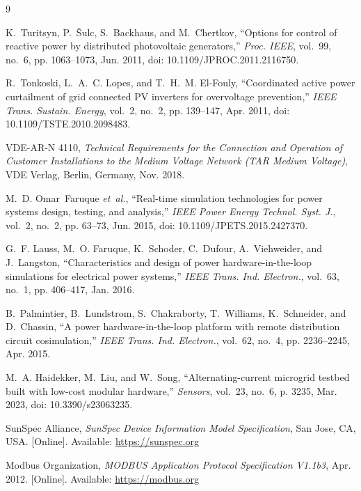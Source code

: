 \documentclass[conference]{IEEEtran}
\begin{document}
\begin{thebibliography}{9}

K.~Turitsyn, P.~\v{S}ulc, S.~Backhaus, and M.~Chertkov, ``Options for
control of reactive power by distributed photovoltaic generators,''
\emph{Proc. IEEE}, vol.~99, no.~6, pp. 1063--1073, Jun. 2011, doi:
10.1109/JPROC.2011.2116750.

R.~Tonkoski, L.~A.~C. Lopes, and T.~H.~M. El-Fouly, ``Coordinated active
power curtailment of grid connected PV inverters for overvoltage
prevention,'' \emph{IEEE Trans. Sustain. Energy}, vol.~2, no.~2, pp.
139--147, Apr. 2011, doi: 10.1109/TSTE.2010.2098483.

VDE-AR-N 4110, \emph{Technical Requirements for the Connection and
Operation of Customer Installations to the Medium Voltage Network (TAR
Medium Voltage)}, VDE Verlag, Berlin, Germany, Nov. 2018.

M.~D. Omar~Faruque \emph{et~al.}, ``Real-time simulation technologies for
power systems design, testing, and analysis,'' \emph{IEEE Power Energy
Technol. Syst. J.}, vol.~2, no.~2, pp. 63--73, Jun. 2015, doi:
10.1109/JPETS.2015.2427370.

G.~F. Lauss, M.~O. Faruque, K.~Schoder, C.~Dufour, A.~Viehweider, and
J.~Langston, ``Characteristics and design of power hardware-in-the-loop
simulations for electrical power systems,'' \emph{IEEE Trans. Ind.
Electron.}, vol.~63, no.~1, pp. 406--417, Jan. 2016.

B.~Palmintier, B.~Lundstrom, S.~Chakraborty, T.~Williams, K.~Schneider,
and D.~Chassin, ``A power hardware-in-the-loop platform with remote
distribution circuit cosimulation,'' \emph{IEEE Trans. Ind. Electron.},
vol.~62, no.~4, pp. 2236--2245, Apr. 2015.

M.~A. Haidekker, M.~Liu, and W.~Song, ``Alternating-current microgrid
testbed built with low-cost modular hardware,'' \emph{Sensors}, vol.~23,
no.~6, p. 3235, Mar. 2023, doi: 10.3390/s23063235.

SunSpec Alliance, \emph{SunSpec Device Information Model Specification},
San Jose, CA, USA. [Online]. Available: \url{https://sunspec.org}

Modbus Organization, \emph{MODBUS Application Protocol Specification
V1.1b3}, Apr. 2012. [Online]. Available: \url{https://modbus.org}


\end{thebibliography}
\end{document}
